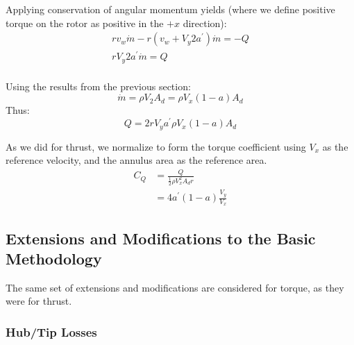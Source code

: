 
Applying conservation of angular momentum yields (where we define positive torque on the rotor as positive in the $+x$ direction):
\begin{equation}
    \begin{aligned}
        r v_w \dot{m} - r (v_w + V_y 2 a^\prime) \dot{m} = -Q\\
         r V_y 2 a^\prime \dot{m} = Q\\
    \end{aligned}
    \label{eq:momQ}
\end{equation}

Using the results from the previous section:
\begin{equation}
    \dot{m} = \rho V_2 A_d = \rho V_x(1-a) A_d
    \label{eq:mdot}
\end{equation}
Thus:
\begin{equation}
    Q = 2 r V_y a^\prime \rho V_x(1-a) A_d
\end{equation}


As we did for thrust, we normalize to form the torque coefficient using $V_x$ as the reference velocity, and the annulus area as the reference area.
\begin{align}
    C_Q &= \frac{Q}{\frac{1}{2}\rho V_x^2 A_d r}\\
     &= 4 a^\prime (1-a) \frac{V_y}{V_x}
\end{align}

\subsection{Extensions and Modifications to the Basic Methodology}

The same set of extensions and modifications are considered for torque, as they were for thrust.

\subsubsection{Hub/Tip Losses}

